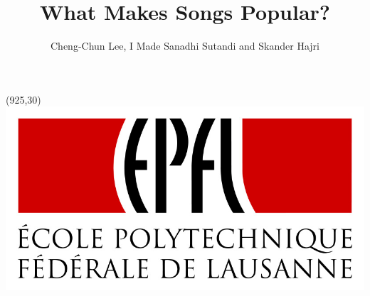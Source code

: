 \documentclass[final]{beamer}
\title{What Makes Songs Popular?} %
\author{Cheng-Chun Lee, I Made Sanadhi Sutandi and Skander Hajri} %
\institute{School of Computer and Communication Sciences, EPFL} %
\begin{document}
\begin{textblock}{30}(925,30)
	\includegraphics[width=6.3\linewidth]{img/epfl-logo.jpg}
\end{textblock}

\end{document}

